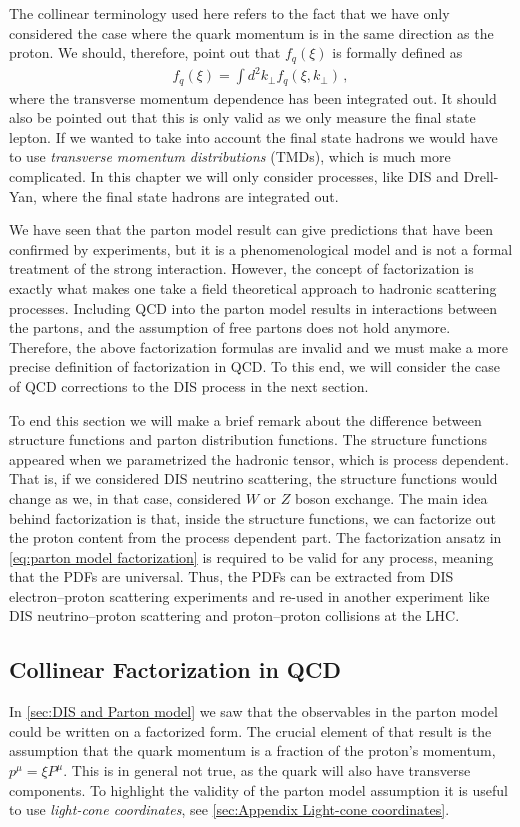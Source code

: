 The collinear terminology used here refers to the fact that we have only considered the case where the quark momentum is in the same direction as the proton. We should, therefore, point out that $f_{q}(\xi)$ is formally defined as
\begin{align}
    f_{q}(\xi)=\int d^{2}k_{\perp}f_{q}(\xi,k_{\perp})\,,
\end{align}
where the transverse momentum dependence has been integrated out. It should also be pointed out that this is only valid as we only measure the final state lepton. If we wanted to take into account the final state hadrons we would have to use \emph{transverse momentum distributions} (TMDs), which is much more complicated. In this chapter we will only consider processes, like DIS and Drell-Yan, where the final state hadrons are integrated out.

\medskip
We have seen that the parton model result can give predictions that have been confirmed by experiments, but it is a phenomenological model and is not a formal treatment of the strong interaction. However, the concept of factorization is exactly what makes one take a field theoretical approach to hadronic scattering processes. Including QCD into the parton model results in interactions between the partons, and the assumption of free partons does not hold anymore. Therefore, the above factorization formulas are invalid and we must make a more precise definition of factorization in QCD. To this end, we will consider the case of QCD corrections to the DIS process in the next section. 

\medskip
To end this section we will make a brief remark about the difference between structure functions and parton distribution functions. The structure functions appeared when we parametrized the hadronic tensor, which is process dependent. That is, if we considered DIS neutrino scattering, the structure functions would change as we, in that case, considered $W$ or $Z$ boson exchange. The main idea behind factorization is that, inside the structure functions, we can factorize out the proton content from the process dependent part. The factorization ansatz in \cref{eq:parton model factorization} is required to be valid for any process, meaning that the PDFs are universal. Thus, the PDFs can be extracted from DIS electron--proton scattering experiments and re-used in another experiment like DIS neutrino--proton scattering and proton--proton collisions at the LHC.

\subsection{Collinear Factorization in QCD}\label{sec:QCD and Collinear factorization}
In \cref{sec:DIS and Parton model} we saw that the observables in the parton model could be written on a factorized form. The crucial element of that result is the assumption that the quark momentum is a fraction of the proton's momentum, $p^{\mu}=\xi P^{\mu}$. This is in general not true, as the quark will also have transverse components. To highlight the validity of the parton model assumption it is useful to use \emph{light-cone coordinates}, see \cref{sec:Appendix Light-cone coordinates}. 

